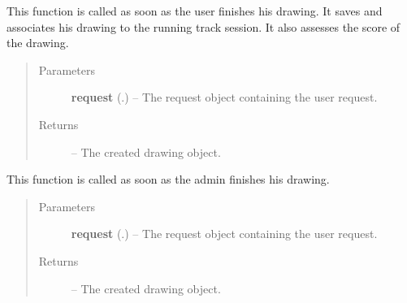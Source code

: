 \documentclass[letterpaper,10pt,english]{sphinxmanual}
\begin{document}

\begin{fulllineitems}
\label{Contour.contour:Contour.contour.views.handle_finished_drawing}
This function is called as soon as the user finishes his drawing. It saves and associates his drawing to the running track session. It also assesses the score of the drawing.
\begin{quote}\begin{description}
\item[{Parameters}] \leavevmode
\textbf{request} (.) -- The request object containing the user request.

\item[{Returns}] \leavevmode
{} -- The created drawing object.

\end{description}\end{quote}

\end{fulllineitems}


\begin{fulllineitems}
\label{Contour.contour:Contour.contour.views.handle_finished_edge_image}
This function is called as soon as the admin finishes his drawing.
\begin{quote}\begin{description}
\item[{Parameters}] \leavevmode
\textbf{request} (.) -- The request object containing the user request.

\item[{Returns}] \leavevmode
{} -- The created drawing object.

\end{description}\end{quote}

\end{fulllineitems}

\end{document}
